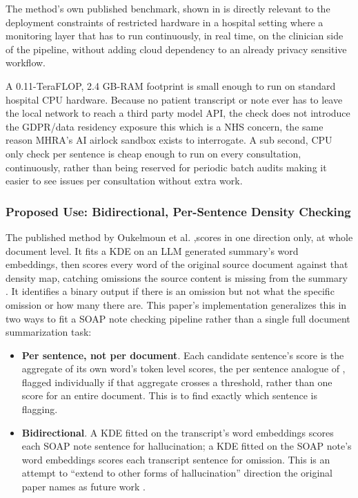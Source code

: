 \documentclass[11pt,a4paper]{article}
\begin{document}
The method's own published benchmark, shown in  is directly relevant to the deployment constraints of restricted hardware in a hospital setting where  a monitoring layer that has to run continuously, in real time, on the clinician side of the pipeline, without adding cloud dependency to an already privacy sensitive workflow.

\begin{table}[htbp]
  \centering
  \caption{Reported scores of KDE against common models on the binary classification of if there is an omission or not in a text \cite{oUKelmoun2025} }
  \label{tab:KDE_paper_table}
\end{table}

A 0.11-TeraFLOP, 2.4 GB-RAM footprint \cite{oUKelmoun2025} is small enough to run on standard hospital CPU hardware.
Because no patient transcript or note ever has to leave the local network to reach a third party model API, the check does not introduce the GDPR/data residency exposure this which is a NHS concern, the same reason MHRA's AI airlock sandbox exists to interrogate. 
A sub second, CPU only check per sentence is cheap enough to run on every consultation, continuously, rather than being reserved for periodic batch audits making it easier to see issues per consultation without extra work.

\subsubsection{ Proposed Use: Bidirectional, Per-Sentence Density Checking}

The published method by Oukelmoun et al. \cite{oUKelmoun2025} ,scores in one direction only, at whole document level. It fits a KDE on an LLM generated summary's word embeddings, then scores every word of the original source document against that density map, catching omissions the source content is missing from the summary \cite{oUKelmoun2025} . It identifies a binary output if there is an omission   but not what the specific omission or how many there are. This paper's implementation  generalizes this in two ways to fit a SOAP note checking pipeline rather than a single full document summarization task: 

\begin{itemize}
    \item \textbf{Per sentence, not per document}. Each candidate sentence's score is the aggregate of its own word's token level scores, the per sentence analogue of ,  flagged individually if that aggregate crosses a threshold, rather than one score for an entire document. This is to find exactly which sentence is flagging.
    \item  \textbf{Bidirectional}. A KDE fitted on the transcript's word embeddings scores each SOAP note sentence for hallucination; a KDE fitted on the SOAP note's word embeddings scores each transcript sentence for omission. This is an attempt to “extend to other forms of hallucination” direction the original paper names as future work \cite{oUKelmoun2025} .
\end{itemize}
 
\end{document}
